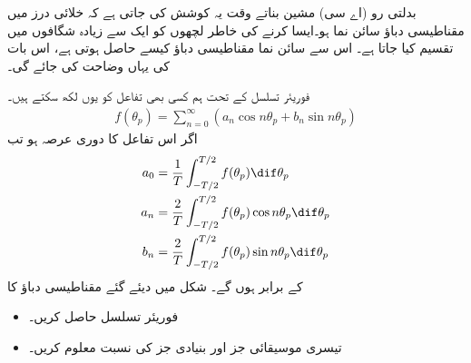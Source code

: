 بدلتی رو (اے سی) مشین بناتے وقت یہ کوشش کی جاتی ہے کہ خلائی درز میں مقناطیسی دباؤ سائن نما ہو۔ایسا کرنے کی خاطر لچھوں کو ایک سے زیادہ شگافوں میں تقسیم کیا جاتا ہے۔ اس سے سائن نما مقناطیسی دباؤ کیسے حاصل ہوتی ہے، اس بات کی  یہاں وضاحت کی جائے گی۔

فوریئر تسلسل کے تحت ہم کسی بھی تفاعل   کو یوں لکھ سکتے ہیں۔
\begin{align}
f(\theta_p)=\sum_{n=0}^{\infty} (a_n \cos n \theta_p +b_n \sin n \theta_p)
\end{align}
اگر اس تفاعل کا دوری عرصہ  ہو تب
\begin{gather}
\begin{aligned}
a_0&=\frac{1}{T} \int_{-T/2}^{T/2} f(\theta_p) \dif \theta_p\\
a_n&=\frac{2}{T} \int_{-T/2}^{T/2} f(\theta_p) \cos n \theta_p \dif \theta_p\\
b_n&=\frac{2}{T} \int_{-T/2}^{T/2} f(\theta_p) \sin n \theta_p \dif \theta_p
\end{aligned}
\end{gather}
کے برابر ہوں گے۔
%
شکل   میں دیئے گئے مقناطیسی دباؤ کا
\begin{itemize}
\item
فوریئر تسلسل حاصل کریں۔
\item
تیسری موسیقائی جز اور بنیادی جز کی نسبت معلوم کریں۔
\end{itemize}

